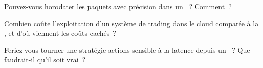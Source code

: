 \begin{interviewq}\label{iq:nw:trading-in-a-public-cloud:4}
Pouvez-vous horodater les paquets avec précision dans un ~? Comment~?
\end{interviewq}

\begin{interviewq}\label{iq:nw:trading-in-a-public-cloud:5}
Combien coûte l'exploitation d'un système de trading dans le cloud comparée à la , et d'où viennent les coûts cachés~?
\end{interviewq}

\begin{interviewq}\label{iq:nw:trading-in-a-public-cloud:6}
Feriez-vous tourner une stratégie actions sensible à la latence depuis un ~? Que faudrait-il qu'il soit vrai~?
\end{interviewq}
